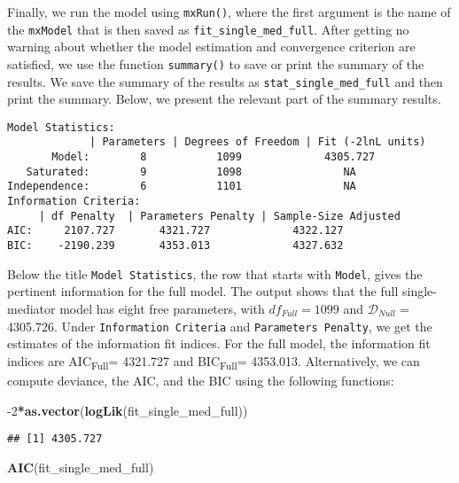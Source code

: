 \documentclass[11pt,]{article}
\newenvironment{Shaded}{\begin{snugshade}}{\end{snugshade}}
\newcommand{\DecValTok}[1]{\textcolor[rgb]{0.00,0.00,0.81}{#1}}
\newcommand{\KeywordTok}[1]{\textcolor[rgb]{0.13,0.29,0.53}{\textbf{#1}}}
\newcommand{\NormalTok}[1]{#1}
\newcommand{\OperatorTok}[1]{\textcolor[rgb]{0.81,0.36,0.00}{\textbf{#1}}}
\begin{document}
Finally, we run the model using \texttt{mxRun()}, where the first
argument is the name of the \texttt{mxModel} that is then saved as
\texttt{fit\_single\_med\_full}. After getting no warning about whether
the model estimation and convergence criterion are satisfied, we use the
function \texttt{summary()} to save or print the summary of the results.
We save the summary of the results as \texttt{stat\_single\_med\_full}
and then print the summary. Below, we present the relevant part of the
summary results.

\begin{verbatim}
Model Statistics:
             | Parameters | Degrees of Freedom | Fit (-2lnL units)
       Model:        8           1099             4305.727
   Saturated:        9           1098                NA
Independence:        6           1101                NA
Information Criteria:
     | df Penalty  | Parameters Penalty | Sample-Size Adjusted
AIC:     2107.727       4321.727             4322.127
BIC:    -2190.239       4353.013             4327.632
\end{verbatim}

Below the title \texttt{Model\ Statistics}, the row that starts with
\texttt{Model}, gives the pertinent information for the full model. The
output shows that the full single-mediator model has eight free
parameters, with \(df_{Full}=1099\) and \(\mathcal{D}_{Null}=\)
4305.726. Under \texttt{Information\ Criteria} and
\texttt{Parameters\ Penalty}, we get the estimates of the information
fit indices. For the full model, the information fit indices are
AIC\textsubscript{Full}= 4321.727 and BIC\textsubscript{Full}= 4353.013.
Alternatively, we can compute deviance, the AIC, and the BIC using the
following functions:

\begin{Shaded}
\begin{Highlighting}[]
\DecValTok{-2}\OperatorTok{*}\KeywordTok{as.vector}\NormalTok{(}\KeywordTok{logLik}\NormalTok{(fit_single_med_full))}
\end{Highlighting}
\end{Shaded}

\begin{verbatim}
## [1] 4305.727
\end{verbatim}

\begin{Shaded}
\begin{Highlighting}[]
\KeywordTok{AIC}\NormalTok{(fit_single_med_full)}
\end{Highlighting}
\end{Shaded}
\end{document}
